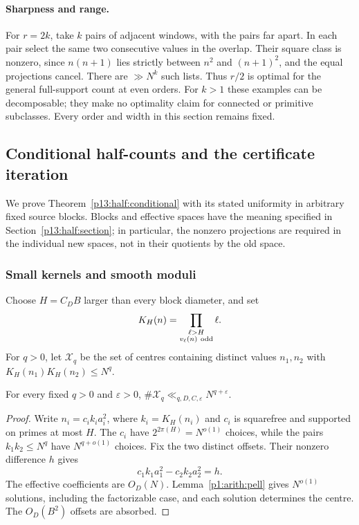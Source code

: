 \paragraph{Sharpness and range.}
For \(r=2k\), take \(k\) pairs of adjacent windows,
with the pairs far apart. In each pair select the same
two consecutive values in the overlap. Their square
class is nonzero, since \(n(n+1)\) lies strictly between
\(n^2\) and \((n+1)^2\), and the equal projections cancel.
There are \(\gg N^k\) such lists.
Thus \(r/2\) is optimal for the general full-support
count at even orders. For \(k>1\) these examples can be
decomposable; they make no optimality claim for connected
or primitive subclasses. Every order and width in this
section remains fixed.

\subsection{Conditional half-counts and the certificate iteration}
\label{p14:comp:half}

We prove Theorem~\ref{p13:half:conditional} with its stated uniformity
in arbitrary fixed source blocks.  Blocks and effective spaces have the
meaning specified in Section~\ref{p13:half:section}; in particular,
the nonzero projections are required in the individual new spaces,
not in their quotients by the old space.

\subsubsection{Small kernels and smooth moduli}

Choose \(H=C_DB\) larger than every block diameter, and set
\[
 K_H(n)=\prod_{\substack{\ell>H\\v_\ell(n)\ {\rm odd}}}\ell.
\]
For \(q>0\), let \(\mathcal X_q\) be the set of centres
containing distinct values \(n_1,n_2\) with
\(K_H(n_1)K_H(n_2)\le N^q\).

\begin{lemma}
\label{p13:half:small-kernels}
For every fixed \(q>0\) and \(\varepsilon>0\),
\(\#\mathcal X_q\ll_{q,D,C,\varepsilon}N^{q+\varepsilon}\).
\end{lemma}

\begin{proof}
Write \(n_i=c_i k_i a_i^2\), where \(k_i=K_H(n_i)\)
and \(c_i\) is squarefree and supported on primes at most \(H\).
The \(c_i\) have \(2^{2\pi(H)}=N^{o(1)}\) choices, while
the pairs \(k_1k_2\le N^q\) have \(N^{q+o(1)}\) choices.
Fix the two distinct offsets. Their nonzero difference \(h\)
gives
\[
 c_1k_1a_1^2-c_2k_2a_2^2=h.
\]
The effective coefficients are \(O_D(N)\).
Lemma~\ref{p1:arith:pell} gives \(N^{o(1)}\) solutions,
including the factorizable case, and each solution determines
the centre. The \(O_D(B^2)\) offsets are absorbed.
\end{proof}

